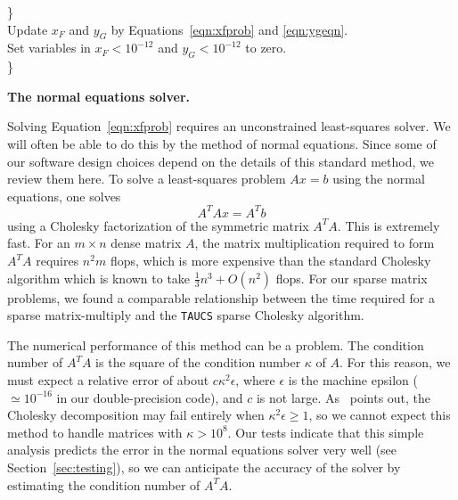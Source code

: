 \documentclass[onecolumn,12pt,tightenlines,amsmath,secnumarabic,%
    floatfix,amssymb,aps,nofootinbib,letterpaper, showkeys]{revtex4}
\renewcommand{\subsection}[1]{\medskip\noindent\textbf{#1.} }
\def\marginpar#1{}   %
\let\lbl=\label
\def\label#1{\lbl{#1}\ifinner\else\marginpar{\ref{#1} #1}\ignorespaces\fi}
\newcommand{\tsnnls}{\texttt{tsnnls} }
\begin{document}
\begin{center}
\begin{minipage}{6.5in}
\begin{tabbing}
\hspace*{1em} \} \\
\hspace*{1em}Update $x_F$ and $y_G$ by Equations~\ref{eqn:xfprob} and \ref{eqn:ygeqn}.\\
\hspace*{1em}Set variables in $x_F < 10^{-12}$ and $y_G < 10^{-12}$ to zero.\\
\} \\
\end{tabbing}
\end{minipage}
\end{center}

\vspace{-0.2in}
\subsection{The normal equations solver}

Solving Equation~\ref{eqn:xfprob} requires an unconstrained least-squares solver. We will often 
be able to do this by the method of normal equations. Since some of our software design choices depend on the details of this standard method, we review them here. To solve a least-squares problem $Ax = b$ using the normal equations, one solves 
\begin{equation}
A^T\!A x = A^T b
\end{equation}
using a Cholesky factorization of the symmetric matrix $A^T\!A$. This is extremely fast. For an $m \times n$ dense matrix $A$, the matrix multiplication required to form $A^T\!A$ requires $n^2 m$ flops, which is more expensive than the standard Cholesky algorithm which is known to take $\frac{1}{3} n^3 + O(n^2)$ flops. For our sparse matrix problems, we found a comparable relationship between the time required for a sparse matrix-multiply and the \texttt{TAUCS} sparse Cholesky algorithm. 

The numerical performance of this method can be a problem. The condition number of $A^T\!A$ is the square of the condition number $\kappa$ of $A$. For this reason, we must expect a relative error of about $c \kappa^2 \epsilon$, where $\epsilon$ is the machine epsilon ($\simeq \!\! 10^{-16}$ in our double-precision code), and $c$ is not large. As~\cite{MR92k:65056} points out, the Cholesky decomposition may fail entirely when $\kappa^2 \epsilon \geq 1$, so we cannot expect this method to handle matrices with $\kappa > 10^8$. Our tests indicate that this simple analysis predicts the error in the normal equations solver very well (see Section~\ref{sec:testing}), so we can anticipate the accuracy of the solver by estimating the condition number of $A^T\!A$.
\end{document}
